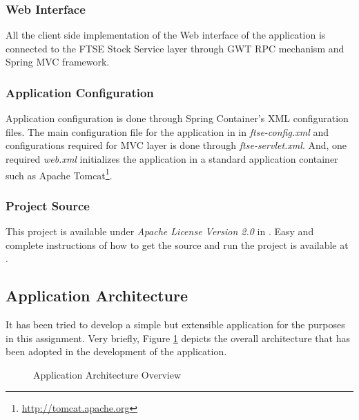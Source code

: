 \documentclass{acm_proc_article-sp}
\begin{document}
\subsubsection{Web Interface}
All the client side implementation of the Web interface of the application is connected to the FTSE Stock Service layer
through GWT RPC mechanism and Spring MVC framework.

\subsubsection{Application Configuration}
Application configuration is done through Spring Container's XML configuration files. The main configuration file for
the application in in \textit{ftse-config.xml} and configurations required for MVC layer is done through
\textit{ftse-servlet.xml}. And, one required \textit{web.xml} initializes the application in a standard application
container such as Apache Tomcat\footnote{\url{http://tomcat.apache.org}}.

\subsubsection{Project Source}
This project is available under \textit{Apache License Version 2.0} in \cite{ftse}. Easy and complete instructions of
how to get the source and run the project is available at \cite{ftse:wiki}.

\subsection{Application Architecture}
It has been tried to develop a simple but extensible application for the purposes in this assignment. Very briefly,
Figure \ref{fig:apparch} depicts the overall architecture that has been adopted in the development of the application.

\begin{figure}[h] 
\centering
\setlength\fboxsep{0.1pt}
\setlength\fboxrule{0.7pt}
\caption{Application Architecture Overview} \label{fig:apparch}
\end{figure}
\end{document}
